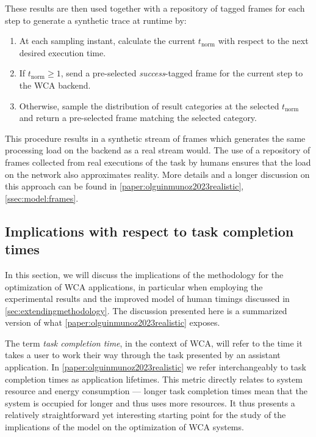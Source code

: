 These results are then used together with a repository of tagged frames for each step to generate a synthetic trace at runtime by:
\begin{enumerate}
    \item At each sampling instant, calculate the current \ensuremath{t_\text{norm}} with respect to the next desired execution time.
    \item If \ensuremath{t_\text{norm} \geq 1}, send a pre-selected \emph{success}-tagged frame for the current step to the \gls{WCA} backend.
    \item Otherwise, sample the distribution of result categories at the selected \ensuremath{t_\text{norm}} and return a pre-selected frame matching the selected category.
\end{enumerate}

This procedure results in a synthetic stream of frames which generates the same processing load on the backend as a real stream would.
The use of a repository of frames collected from real executions of the task by humans ensures that the load on the network also approximates reality.
More details and a longer discussion on this approach can be found in \cref{paper:olguinmunoz2023realistic}, \cref{ssec:model:frames}.

\subsection{Implications with respect to task completion times}

In this section, we will discuss the implications of the methodology for the optimization of \gls{WCA} applications, in particular when employing the experimental results and the improved model of human timings discussed in \cref{sec:extendingmethodology}.
The discussion presented here is a summarized version of what \cref{paper:olguinmunoz2023realistic} exposes.



The term \emph{task completion time}, in the context of \gls{WCA}, will refer to the time it takes a user to work their way through the task presented by an assistant application.
In \cref{paper:olguinmunoz2023realistic} we refer interchangeably to task completion times as application lifetimes.
This metric directly relates to system resource and energy consumption --- longer task completion times mean that the system is occupied for longer and thus uses more resources.
It thus presents a relatively straightforward yet interesting starting point for the study of the implications of the model on the optimization of \gls{WCA} systems.

